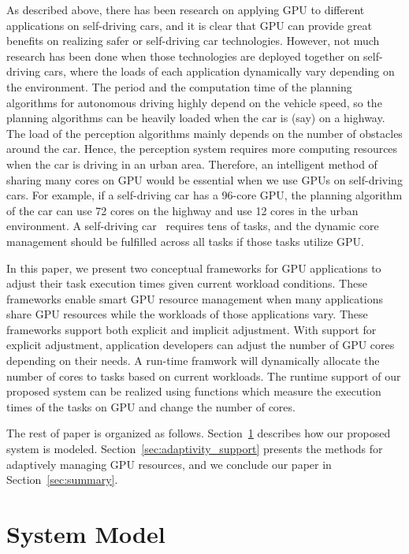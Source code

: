 \documentclass[times, 10pt, twocolumn]{article}
\begin{document}
As described above, there has been research on applying GPU to different applications on self-driving cars, and it is clear that GPU can provide great benefits on realizing safer or self-driving car technologies. However, not much research has been done when those technologies are deployed together on self-driving cars, where the loads of each application dynamically vary depending on the environment. The period and the computation time of the planning algorithms for autonomous driving highly depend on the vehicle speed, so the planning algorithms can be heavily loaded when the car is (say) on a highway. The load of the perception algorithms mainly depends on the number of obstacles around the car. Hence, the perception system requires more computing resources when the car is driving in an urban area. Therefore, an intelligent method of sharing many cores on GPU would be essential when we use GPUs on self-driving cars. For example, if a self-driving car has a 96-core GPU, the planning algorithm of the car can use 72 cores on the highway and use 12 cores in the urban environment. A self-driving car~\cite{Urmson08} requires tens of tasks, and the dynamic core management should be fulfilled across all tasks if those tasks utilize GPU. 

In this paper, we present two conceptual frameworks for
GPU applications to adjust their task execution times 
given current workload conditions. These frameworks enable
smart GPU resource management when many applications
share GPU resources while the workloads of those applications vary. 
These frameworks support both explicit and implicit adjustment. 
With support for explicit adjustment, %
application developers can adjust the number
of GPU cores depending on their needs. %
A run-time framwork will dynamically
allocate the number of cores to tasks based on current 
workloads. The runtime support of our proposed system
can be realized using functions which measure the execution 
times of the tasks on GPU and change the number of cores.

The rest of paper is organized as follows. Section~\ref{sec:system_model} describes how our proposed system is modeled. Section~\ref{sec:adaptivity_support} presents the methods for adaptively managing GPU resources, and we conclude our paper in Section~\ref{sec:summary}.

\section{System Model}
\label{sec:system_model}
\end{document}
